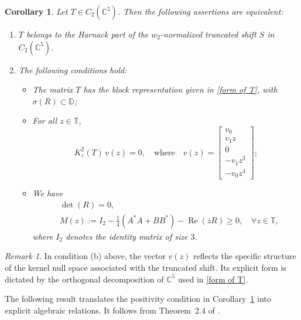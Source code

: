 \documentclass[12pt, reqno]{amsart}
\newtheorem{corollary}[theorem]{Corollary}
\theoremstyle{definition}
\theoremstyle{remark}
\newtheorem{remark}[theorem]{Remark}
\numberwithin{equation}{section}
\begin{document}
\begin{corollary}\label{Corollary2S5}
	Let $T \in C_2(\mathbb{C}^{5})$. Then the following assertions are equivalent:  
	\begin{enumerate}
		\item[(i)] $T$ belongs to the Harnack part of the $w_2$-normalized truncated shift $S$ in $C_2(\mathbb{C}^{5})$.
		\item[(ii)] The following conditions hold:
		\begin{itemize}
			\item[(a)] The matrix $T$ has the block representation given in \eqref{form of T}, with $\sigma(R)\subset \mathbb{D}$;  
			\item[(b)] For all $z\in \mathbb{T}$, 
			\begin{equation}\label{KER}		
				K_z^2(T)\, v(z) = 0, \quad \text{where} \quad v(z) =
				\begin{bmatrix}
					v_0 \\
					v_1 z \\
					0 \\
					-v_1 z^3 \\
					-v_0 z^4
				\end{bmatrix};
			\end{equation}
			\item[(c)] We have
			\begin{align}
				&\det(R) = 0, \label{p1S5}\\	
				&M(z) := I_{2} - \frac{1}{4}(A^*A + BB^*) - \operatorname{Re}(\overline{z}R) \geq 0, \quad \forall z\in \mathbb{T}, \label{p2S5}
			\end{align}
			where $I_{2}$ denotes the identity matrix of size $3$.
		\end{itemize}
	\end{enumerate}
\end{corollary}

\begin{remark}
	In condition (b) above, the vector $v(z)$ reflects the specific structure of the kernel null space associated with the truncated shift. Its explicit form is dictated by the orthogonal decomposition of $\mathbb{C}^5$ used in \eqref{form of T}.
\end{remark}

The following result translates the positivity condition in Corollary~\ref{Corollary2S5} into explicit algebraic relations. It follows from Theorem~2.4 of \cite{CaNaBe2024}.
\end{document}
